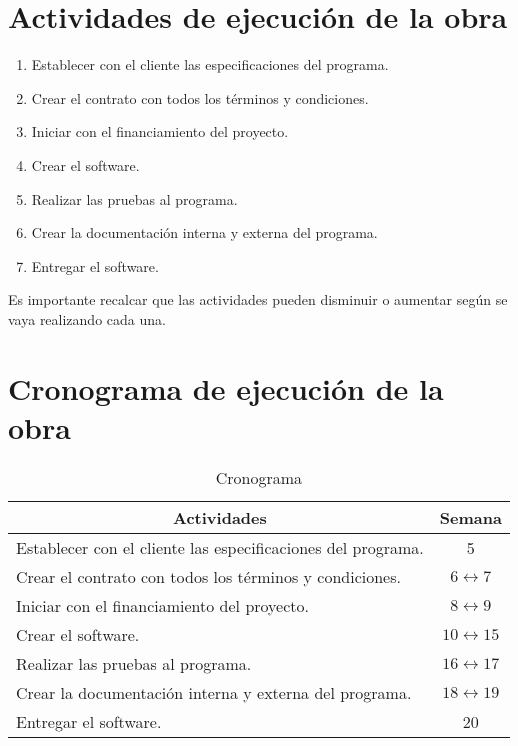 \documentclass[conference]{IEEEtran}
\begin{document}
\section{Actividades de ejecución de la obra}

\begin{enumerate}

\item Establecer con el cliente las especificaciones del programa.
\item Crear el contrato con todos los términos y condiciones.
\item Iniciar con el financiamiento del proyecto.
\item Crear el software.
\item Realizar las pruebas al programa.
\item Crear la documentación interna y externa del programa.
\item Entregar el software.
\end{enumerate}

Es importante recalcar que las actividades pueden disminuir o aumentar según se vaya realizando cada una.
\section{Cronograma de ejecución de la obra}

\begin{table}[H]
  \centering
  \caption{Cronograma}
    \begin{tabular}{|l|c|}
    \toprule
    \multicolumn{1}{|c|}{\textbf{Actividades}} & \textbf{Semana} \\
    \midrule
    \multicolumn{1}{|l|}{\multirow{3}[2]{*}{Establecer con el cliente las especificaciones del programa.}} & \multirow{3}[2]{*}{5} \\
          &  \\
          &  \\
    \midrule
    \multirow{2}[2]{*}{Crear el contrato con todos los términos y condiciones.} & \multirow{2}[2]{*}{$6\leftrightarrow7$} \\
          &  \\
    \midrule
    \multirow{2}[2]{*}{Iniciar con el financiamiento del proyecto.} & \multirow{2}[2]{*}{$8\leftrightarrow9$} \\
          &  \\
    \midrule
    \multirow{2}[2]{*}{Crear el software.} & \multirow{2}[2]{*}{$10\leftrightarrow15$} \\
          &  \\
    \midrule
    \multirow{2}[2]{*}{Realizar las pruebas al programa.} & \multirow{2}[2]{*}{$16\leftrightarrow17$} \\
          &  \\
    \midrule
    \multirow{2}[2]{*}{Crear la documentación interna y externa del programa.} & \multirow{2}[2]{*}{$18\leftrightarrow19$} \\
          &  \\
    \midrule
    Entregar el software. & 20 \\
    \bottomrule
    \end{tabular}%
  \label{tab:addlabel}%
\end{table}%
\end{document}
